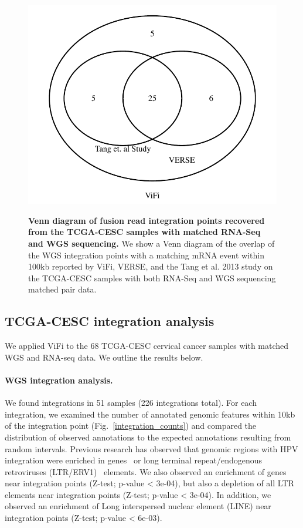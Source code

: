\documentclass[12pt]{article}
\begin{document}
\begin{figure}[htpb]
  \centering
  \includegraphics[width=1\linewidth]{results/tcga_triple.pdf}\\
\caption[Venn diagram of fusion reads recovered from the RNAseq data from Larsson 2013 study]
{\label{venn_diagram}  {\bf Venn diagram of fusion read integration points recovered from the TCGA-CESC samples with matched RNA-Seq and WGS sequencing.}  We show a Venn diagram of the overlap of the WGS integration points with a matching mRNA event within 100kb reported by ViFi, VERSE, and the Tang et al. 2013 study on the TCGA-CESC samples with both RNA-Seq and WGS sequencing matched pair data.  }
\end{figure}

\subsection{TCGA-CESC integration analysis}
We applied ViFi to the 68 TCGA-CESC cervical cancer samples with matched WGS and RNA-seq data.  We outline the results below.
\paragraph{\textbf{WGS integration analysis}.} We found integrations in 51 samples (226 integrations total).  For each integration, we examined the number of annotated genomic features within 10kb of the integration point (Fig.~\ref{integration_counts}) and compared the distribution of observed annotations to the expected annotations resulting from random intervals.  Previous research has observed that genomic regions with HPV integration were enriched in genes~\cite{Akagi2014} or long terminal repeat/endogenous retroviruses (LTR/ERV1)~\cite{Hu2015} elements. We also observed an enrichment of genes near integration points (Z-test; p-value < 3e-04), but also a depletion of all LTR elements near integration points (Z-test; p-value < 3e-04).  In addition, we observed an enrichment of Long interspersed nuclear element (LINE) near integration points (Z-test; p-value < 6e-03).  
\end{document}

